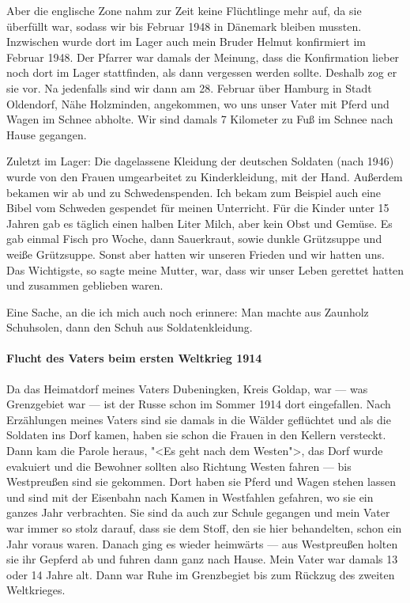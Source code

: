\documentclass[12pt, twoside]{book}
\begin{document}
Aber die englische Zone nahm zur Zeit keine Flüchtlinge mehr auf, da sie überfüllt war, sodass wir bis Februar 1948 in Dänemark bleiben mussten.
Inzwischen wurde dort im Lager auch mein Bruder Helmut konfirmiert im Februar 1948.
Der Pfarrer war damals der Meinung, dass die Konfirmation lieber noch dort im Lager stattfinden, als dann vergessen werden sollte.
Deshalb zog er sie vor.
Na jedenfalls sind wir dann am 28. Februar über Hamburg in Stadt Oldendorf, Nähe Holzminden, angekommen, wo uns unser Vater mit Pferd und Wagen im Schnee abholte.
Wir sind damals 7 Kilometer zu Fuß im Schnee nach Hause gegangen.

Zuletzt im Lager:
Die dagelassene Kleidung der deutschen Soldaten (nach 1946) wurde von den Frauen umgearbeitet zu Kinderkleidung, mit der Hand.
Außerdem bekamen wir ab und zu Schwedenspenden. Ich bekam zum Beispiel auch eine Bibel vom Schweden gespendet für meinen Unterricht.
Für die Kinder unter 15 Jahren gab es täglich einen halben Liter Milch, aber kein Obst und Gemüse. Es gab einmal Fisch pro Woche, dann Sauerkraut, sowie dunkle Grützsuppe und weiße Grützsuppe.
Sonst aber hatten wir unseren Frieden und wir hatten uns. Das Wichtigste, so sagte meine Mutter, war, dass wir unser Leben gerettet hatten und zusammen geblieben waren.

Eine Sache, an die ich mich auch noch erinnere: Man machte aus Zaunholz Schuhsolen, dann den Schuh aus Soldatenkleidung.


\paragraph{Flucht des Vaters beim ersten Weltkrieg 1914} Da das Heimatdorf meines Vaters Dubeningken, Kreis Goldap, war --- was Grenzgebiet war --- ist der Russe schon im Sommer 1914 dort eingefallen. Nach Erzählungen meines Vaters sind sie damals in die Wälder geflüchtet und als die Soldaten ins Dorf kamen, haben sie schon die Frauen in den Kellern versteckt.
Dann kam die Parole heraus, "<Es geht nach dem Westen">, das Dorf wurde evakuiert und die Bewohner sollten also Richtung Westen fahren --- bis Westpreußen sind sie gekommen. Dort haben sie Pferd und Wagen stehen lassen und sind mit der Eisenbahn nach Kamen in Westfahlen gefahren, wo sie ein ganzes Jahr verbrachten.
Sie sind da auch zur Schule gegangen und mein Vater war immer so stolz darauf, dass sie dem Stoff, den sie hier behandelten, schon ein Jahr voraus waren.
Danach ging es wieder heimwärts --- aus Westpreußen holten sie ihr Gepferd ab und fuhren dann ganz nach Hause. Mein Vater war damals 13 oder 14 Jahre alt.
Dann war Ruhe im Grenzbegiet bis zum Rückzug des zweiten Weltkrieges.
\end{document}

